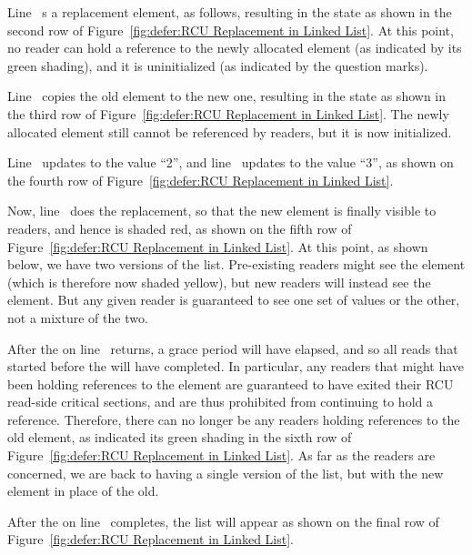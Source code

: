 \begin{fcvref}
Line~ s a replacement element, as follows,
resulting in the state as shown in the second row of
Figure~\ref{fig:defer:RCU Replacement in Linked List}.
At this point, no reader can hold a reference to the newly allocated
element (as indicated by its green shading), and it is uninitialized
(as indicated by the question marks).

Line~ copies the old element to the new one, resulting in the
state as shown in the third row of
Figure~\ref{fig:defer:RCU Replacement in Linked List}.
The newly allocated element still cannot be referenced by readers, but
it is now initialized.

Line~ updates  to the value ``2'', and
line~ updates  to the value ``3'',
as shown on the fourth row of
Figure~\ref{fig:defer:RCU Replacement in Linked List}.

Now, line~ does the replacement, so that the new element is
finally visible to readers, and hence is shaded red, as shown on
the fifth row of
Figure~\ref{fig:defer:RCU Replacement in Linked List}.
At this point, as shown below, we have two versions of the list.
Pre-existing readers might see the  element (which is
therefore now shaded yellow), but
new readers will instead see the  element.
But any given reader is guaranteed to see one set of values or the
other, not a mixture of the two.

After the  on line~ returns,
a grace period will have elapsed, and so all reads that started before the
 will have completed.
In particular, any readers that might have been holding references
to the  element are guaranteed to have exited
their RCU read-side critical sections, and are thus prohibited from
continuing to hold a reference.
Therefore, there can no longer be any readers holding references
to the old element, as indicated its green shading in the sixth row of
Figure~\ref{fig:defer:RCU Replacement in Linked List}.
As far as the readers are concerned, we are back to having a single version
of the list, but with the new element in place of the old.

After the  on line~ completes, the list will
appear as shown on the final row of
Figure~\ref{fig:defer:RCU Replacement in Linked List}.
\end{fcvref}

